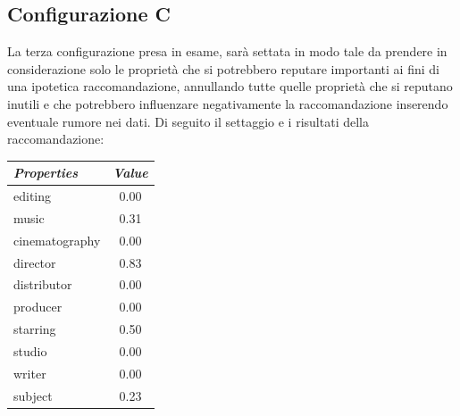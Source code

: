 \subsection{Configurazione C}
La terza configurazione presa in esame, sarà settata in modo tale da prendere in considerazione solo le proprietà che si potrebbero reputare importanti ai fini di una ipotetica raccomandazione, annullando tutte quelle proprietà che si reputano inutili e che potrebbero influenzare negativamente la raccomandazione inserendo eventuale rumore nei dati. Di seguito il settaggio e i risultati della raccomandazione:
\begin{table}[H]
	\small
	\centering
	\begin{tabular}{l c}
		\textit{Properties} & \textit{Value} \\\hline
		editing & 0.00 \\
		music & 0.31 \\
		cinematography & 0.00\\
		director & 0.83\\
		distributor & 0.00\\
		producer & 0.00 \\
		starring & 0.50\\
		studio & 0.00\\
		writer & 0.00\\
		subject & 0.23\\
	\end{tabular}
\end{table}

